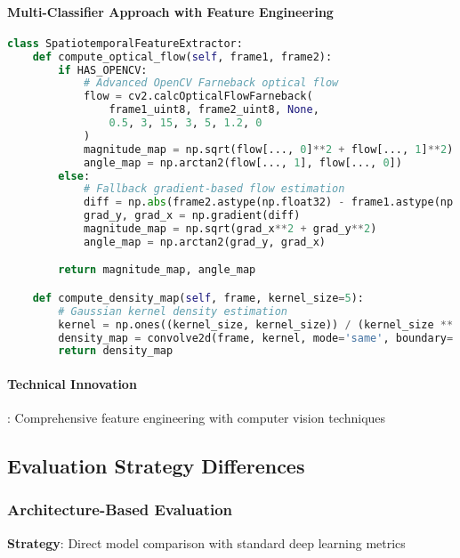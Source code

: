 \documentclass[11pt,a4paper]{article}
\begin{document}
\paragraph{Multi-Classifier Approach with Feature Engineering}
\begin{lstlisting}[language=Python, caption=Feature-Based Technical Implementation]
class SpatiotemporalFeatureExtractor:
    def compute_optical_flow(self, frame1, frame2):
        if HAS_OPENCV:
            # Advanced OpenCV Farneback optical flow
            flow = cv2.calcOpticalFlowFarneback(
                frame1_uint8, frame2_uint8, None,
                0.5, 3, 15, 3, 5, 1.2, 0
            )
            magnitude_map = np.sqrt(flow[..., 0]**2 + flow[..., 1]**2)
            angle_map = np.arctan2(flow[..., 1], flow[..., 0])
        else:
            # Fallback gradient-based flow estimation
            diff = np.abs(frame2.astype(np.float32) - frame1.astype(np.float32))
            grad_y, grad_x = np.gradient(diff)
            magnitude_map = np.sqrt(grad_x**2 + grad_y**2)
            angle_map = np.arctan2(grad_y, grad_x)

        return magnitude_map, angle_map

    def compute_density_map(self, frame, kernel_size=5):
        # Gaussian kernel density estimation
        kernel = np.ones((kernel_size, kernel_size)) / (kernel_size ** 2)
        density_map = convolve2d(frame, kernel, mode='same', boundary='symm')
        return density_map
\end{lstlisting}

\paragraph{Technical Innovation}: Comprehensive feature engineering with computer vision techniques

\subsection{Evaluation Strategy Differences}

\subsubsection{Architecture-Based Evaluation}
\textbf{Strategy}: Direct model comparison with standard deep learning metrics
\end{document}
